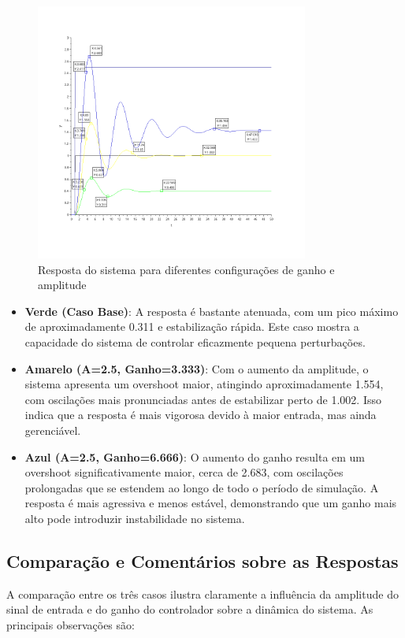 \begin{figure}[H]
    \centering
    \includegraphics[width=0.8\textwidth]{5-atividade/assets/simulation-c.png}
    \caption{Resposta do sistema para diferentes configurações de ganho e amplitude}
    \label{fig:response_comparison}
\end{figure}

\begin{itemize}
    \item \textbf{Verde (Caso Base)}: A resposta é bastante atenuada, com um pico máximo de aproximadamente 0.311 e estabilização rápida. Este caso mostra a capacidade do sistema de controlar eficazmente pequena perturbações.

    \item \textbf{Amarelo (A=2.5, Ganho=3.333)}: Com o aumento da amplitude, o sistema apresenta um overshoot maior, atingindo aproximadamente 1.554, com oscilações mais pronunciadas antes de estabilizar perto de 1.002. Isso indica que a resposta é mais vigorosa devido à maior entrada, mas ainda gerenciável.

    \item \textbf{Azul (A=2.5, Ganho=6.666)}: O aumento do ganho resulta em um overshoot significativamente maior, cerca de 2.683, com oscilações prolongadas que se estendem ao longo de todo o período de simulação. A resposta é mais agressiva e menos estável, demonstrando que um ganho mais alto pode introduzir instabilidade no sistema.
\end{itemize}

\subsection{Comparação e Comentários sobre as Respostas}
A comparação entre os três casos ilustra claramente a influência da amplitude do sinal de entrada e do ganho do controlador sobre a dinâmica do sistema. As principais observações são:

